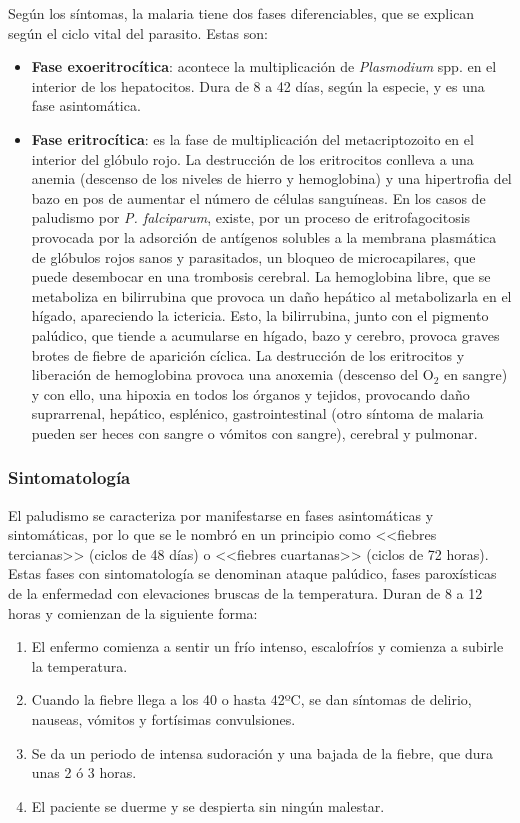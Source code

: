 Según los síntomas, la malaria tiene dos fases diferenciables, que se explican según el ciclo vital del parasito. Estas son:
\begin{itemize}
	\item \textbf{Fase exoeritrocítica}: acontece la multiplicación de \textit{Plasmodium} spp. en el interior de los hepatocitos. Dura de 8 a 42 días, según la especie, y es una fase asintomática.
	\item\textbf{Fase eritrocítica}: es la fase de multiplicación del metacriptozoito en el interior del glóbulo rojo. La destrucción de los eritrocitos conlleva a una anemia (descenso de los niveles de hierro y hemoglobina) y una hipertrofia del bazo en pos de aumentar el número de células sanguíneas. En los casos de paludismo por \textit{P. falciparum}, existe, por un proceso de eritrofagocitosis provocada por la adsorción de antígenos solubles a la membrana plasmática de glóbulos rojos sanos y parasitados, un bloqueo de microcapilares, que puede desembocar en una trombosis cerebral.
	La hemoglobina libre, que se metaboliza en bilirrubina que provoca un daño hepático al metabolizarla en el hígado, apareciendo la ictericia. Esto, la bilirrubina, junto con el pigmento palúdico, que tiende a acumularse en hígado, bazo y cerebro, provoca graves brotes de fiebre de aparición cíclica. La destrucción de los eritrocitos y liberación de hemoglobina provoca una anoxemia (descenso del O$_2$ en sangre) y con ello, una hipoxia en todos los órganos y tejidos, provocando daño suprarrenal, hepático, esplénico, gastrointestinal (otro síntoma de malaria pueden ser heces con sangre o vómitos con sangre), cerebral y pulmonar.
\end{itemize}
\subsubsection{Sintomatología}
El paludismo se caracteriza por manifestarse en fases asintomáticas y sintomáticas, por lo que se le nombró en un principio como <<fiebres tercianas>> (ciclos de 48 días) o <<fiebres cuartanas>> (ciclos de 72 horas). Estas fases con sintomatología se denominan ataque palúdico, fases paroxísticas de la enfermedad con elevaciones bruscas de la temperatura. Duran de 8 a 12 horas y comienzan de la siguiente forma:
\begin{enumerate}[itemsep=0pt,parsep=0pt,topsep=0pt,partopsep=0pt]
	\item El enfermo comienza a sentir un frío intenso, escalofríos y comienza a subirle la temperatura.
	\item Cuando la fiebre llega a los 40 o hasta 42ºC, se dan síntomas de delirio, nauseas, vómitos y fortísimas convulsiones.
	\item Se da un periodo de intensa sudoración y una bajada de la fiebre, que dura unas 2 ó 3 horas.
	\item El paciente se duerme y se despierta sin ningún malestar.
\end{enumerate}

